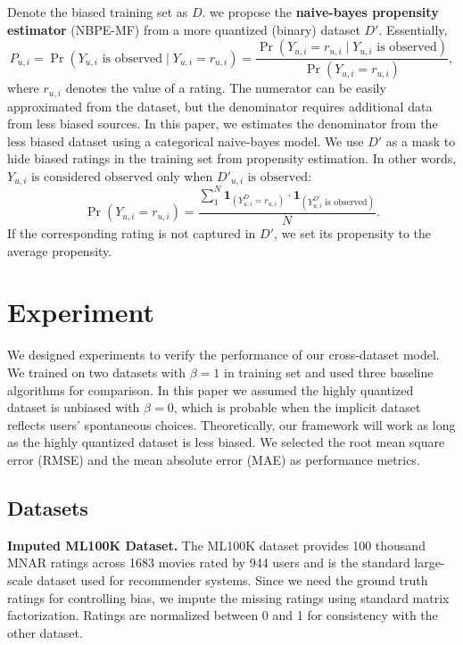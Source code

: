 \documentclass{article}
\newcommand{\vect}[1]{\boldsymbol{#1}}
\begin{document}
Denote the biased training set as $D$. we propose the \textbf{naive-bayes propensity estimator} (NBPE-MF) from a more quantized (binary) dataset $D'$. Essentially,
\begin{equation} 
  P_{u,i} = \Pr(Y_{u,i} \text{ is observed} \mid Y_{u,i} = r_{u,i}) = \frac{\Pr(Y_{u,i} = r_{u,i} \mid Y_{u,i} \text{ is observed})}{\Pr(Y_{u,i} = r_{u,i})},
\end{equation}
where $r_{u,i}$ denotes the value of a rating. The numerator can be easily approximated from the dataset, but the denominator requires additional data from less biased sources. In this paper, we estimates the denominator from the less biased dataset using a categorical naive-bayes model. We use $D'$ as a mask to hide biased ratings in the training set from propensity estimation. In other words, $Y_{u,i} \text{ is considered observed}$ only when $D'_{u,i} \text{ is observed}$:
\begin{equation} 
  \Pr(Y_{u,i} = r_{u,i}) = \frac{\sum_1^N \vect 1_{(Y^D_{u,i} = r_{u,i})} \cdot \vect 1_{(Y^{D'}_{u,i} \text{ is observed})} }{N}.
\end{equation}
If the corresponding rating is not captured in $D'$, we set its propensity to the average propensity.

\section{Experiment}
We designed experiments to verify the performance of our cross-dataset model. We trained on two datasets with $\beta =1$ in training set and used three baseline algorithms for comparison. In this paper we assumed the highly quantized dataset is unbiased with $\beta=0$, which is probable when the implicit dataset reflects users' spontaneous choices. Theoretically, our framework will work as long as the highly quantized dataset is less biased. We selected the root mean square error (RMSE) and the mean absolute error (MAE) as performance metrics. 

\subsection{Datasets}
\textbf{Imputed ML100K Dataset.}
The ML100K dataset provides 100 thousand MNAR ratings across 1683 movies rated by 944 users and is the standard large-scale dataset used for recommender systems. Since we need the ground truth ratings for controlling bias, we impute the missing ratings using standard matrix factorization. Ratings are normalized between 0 and 1 for consistency with the other dataset. 
\end{document}
